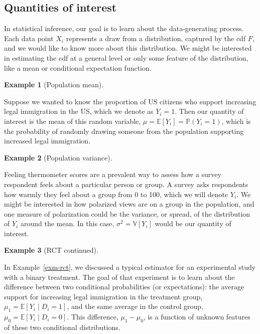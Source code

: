\documentclass[
  letterpaper,
  DIV=11,
  numbers=noendperiod]{scrreprt}
\newcommand{\E}{\mathbb{E}}
\newcommand{\V}{\mathbb{V}}
\renewcommand{\P}{\mathbb{P}}
\theoremstyle{definition}
\newtheorem{example}{Example}[chapter]
\theoremstyle{definition}
\theoremstyle{plain}
\theoremstyle{remark}
\begin{document}
\hypertarget{quantities-of-interest}{%
\subsection{Quantities of interest}\label{quantities-of-interest}}

In statistical inference, our goal is to learn about the data-generating
process. Each data point \(X_i\) represents a draw from a distribution,
captured by the cdf \(F\), and we would like to know more about this
distribution. We might be interested in estimating the cdf at a general
level or only some feature of the distribution, like a mean or
conditional expectation function.

\begin{example}[Population
mean]\protect\hypertarget{exm-prop}{}\label{exm-prop}

Suppose we wanted to know the proportion of US citizens who support
increasing legal immigration in the US, which we denote as \(Y_i = 1\).
Then our quantity of interest is the mean of this random variable,
\(\mu = \E[Y_i] = \P(Y_{i} = 1)\), which is the probability of randomly
drawing someone from the population supporting increased legal
immigration.

\end{example}

\begin{example}[Population
variance]\protect\hypertarget{exm-var}{}\label{exm-var}

Feeling thermometer scores are a prevalent way to assess how a survey
respondent feels about a particular person or group. A survey asks
respondents how warmly they feel about a group from 0 to 100, which we
will denote \(Y_i\). We might be interested in how polarized views are
on a group in the population, and one measure of polarization could be
the variance, or spread, of the distribution of \(Y_i\) around the mean.
In this case, \(\sigma^2 = \V[Y_i]\) would be our quantity of interest.

\end{example}

\begin{example}[RCT
continued]\protect\hypertarget{exm-rct-ii}{}\label{exm-rct-ii}

In Example~\ref{exm-rct}, we discussed a typical estimator for an
experimental study with a binary treatment. The goal of that experiment
is to learn about the difference between two conditional probabilities
(or expectations): the average support for increasing legal immigration
in the treatment group, \(\mu_1 = \E[Y_i \mid D_i = 1]\), and the same
average in the control group, \(\mu_0 = \E[Y_i \mid D_i = 0]\). This
difference, \(\mu_1 - \mu_0\), is a function of unknown features of
these two conditional distributions.

\end{example}
\end{document}
